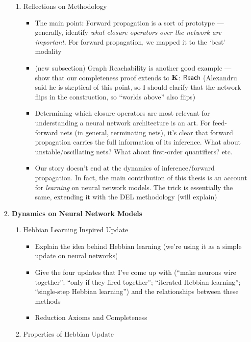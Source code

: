 \documentclass[letterpaper]{article}
\begin{document}
\begin{enumerate}
\begin{enumerate}
        \item Reflections on Methodology
        \begin{itemize}
            \item The main point: Forward propagation is a sort of prototype --- generally, identify \emph{what closure operators over the network are important}.  For forward propagation, we mapped it to the `best' modality
            \item (new subsection) Graph Reachability is another good example --- show that our completeness proof extends to $\textrm{\textup{\textbf{K}}}$: $\mathsf{Reach}$ (Alexandru said he is skeptical of this point, so I should clarify that the network flips in the construction, so ``worlds above'' also flips)
            \item Determining which closure operators are most relevant for understanding a neural network architecture is an art.  For feed-forward nets (in general, terminating nets), it's clear that forward propagation carries the full information of its inference.  What about unstable/oscillating nets?  What about first-order quantifiers? etc.
            \item Our story doesn't end at the dynamics of inference/forward propagation.  In fact, the main contribution of this thesis is an account for \emph{learning} on neural network models.  The trick is essentially the same, extending it with the DEL methodology (will explain)
        \end{itemize}

    \end{enumerate}

    \item \textbf{Dynamics on Neural Network Models}
    \begin{enumerate}
        \item Hebbian Learning Inspired Update
        \begin{itemize}
            \item Explain the idea behind Hebbian learning (we're using it as a simple update on neural networks)
            \item Give the four updates that I've come up with (``make neurons wire together''; ``only if they fired together''; ``iterated Hebbian learning''; ``single-step Hebbian learning'') and the relationships between these methods
            \item Reduction Axioms and Completeness
        \end{itemize}

        \item Properties of Hebbian Update


\end{enumerate}
\end{enumerate}
\end{document}
